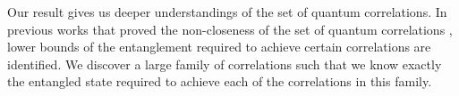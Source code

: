 \documentclass[11pt,letterpaper]{article}
\newcommand{\ket}[1]{|#1\rangle}
\newcommand{\bra}[1]{\langle#1|}
\newcommand{\ketbra}[2]{|#1\rangle\langle#2|}
\newcommand{\x}{\otimes}
\DeclareMathOperator{\Tr}{Tr}
\newcommand{\calX}{\mathcal{X}}
\newcommand{\calY}{\mathcal{Y}}
\newcommand{\1}{\mathbb{1}}
\newcommand{\LS}{LS}
\newcommand{\EPR}[1]{\Sigma^{(#1)}}
\newcommand{\dr}[1]{d^{(#1)}}
\newtheorem{theorem}{Theorem}[section]
\theoremstyle{definition}
\begin{document}
Our result gives us deeper understandings of the set of quantum correlations.
In previous works that proved the non-closeness of the set of quantum correlations \cite{slofstra2017, slofstra2018}, 
lower bounds of the entanglement required to achieve certain correlations are identified.
We discover a large family of correlations such that we know exactly the entangled state
required to achieve each of the correlations in this family. 

\end{document}
